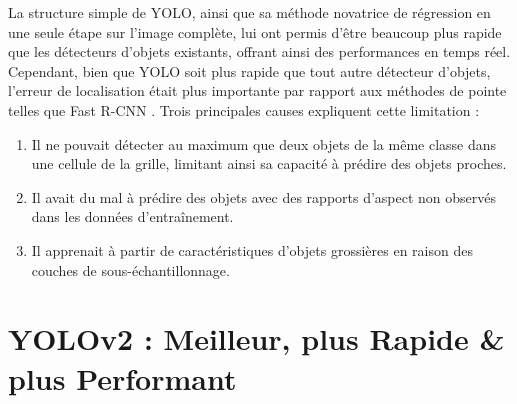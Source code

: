 \documentclass{article}
\begin{document}
La structure simple de YOLO, ainsi que sa méthode novatrice de régression en une seule étape sur l'image complète, lui ont permis d'être beaucoup plus rapide que les détecteurs d'objets existants, offrant ainsi des performances en temps réel.
\vspace{0.2cm}\\
Cependant, bien que YOLO soit plus rapide que tout autre détecteur d'objets, l'erreur de localisation était plus importante par rapport aux méthodes de pointe telles que Fast R-CNN \cite{39}. Trois principales causes expliquent cette limitation :
\begin{enumerate}
    \item Il ne pouvait détecter au maximum que deux objets de la même classe dans une cellule de la grille, limitant ainsi sa capacité à prédire des objets proches.
    \item Il avait du mal à prédire des objets avec des rapports d'aspect non observés dans les données d'entraînement.
    \item Il apprenait à partir de caractéristiques d'objets grossières en raison des couches de sous-échantillonnage.
\end{enumerate}


\section{YOLOv2 : Meilleur, plus Rapide \& plus Performant}
\end{document}

